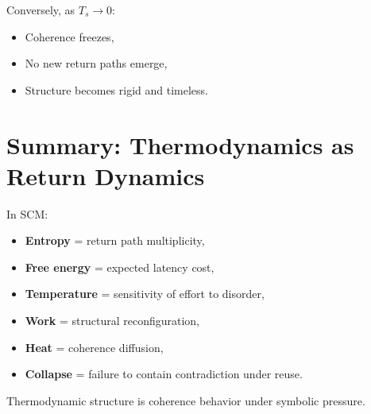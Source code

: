 Conversely, as $T_s \to 0$:
\begin{itemize}
  \item Coherence freezes,
  \item No new return paths emerge,
  \item Structure becomes rigid and timeless.
\end{itemize}

\section{Summary: Thermodynamics as Return Dynamics} \label{sec:thermo-summary}

In SCM:
\begin{itemize}
  \item \textbf{Entropy} = return path multiplicity,
  \item \textbf{Free energy} = expected latency cost,
  \item \textbf{Temperature} = sensitivity of effort to disorder,
  \item \textbf{Work} = structural reconfiguration,
  \item \textbf{Heat} = coherence diffusion,
  \item \textbf{Collapse} = failure to contain contradiction under reuse.
\end{itemize}

Thermodynamic structure is coherence behavior under symbolic pressure.
